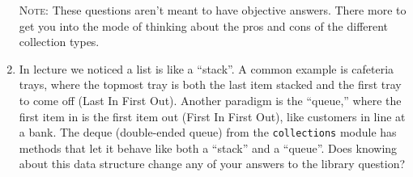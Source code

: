 \documentclass{article}
\begin{document}
\begin{enumerate}
  \textsc{Note}: These questions aren't meant to have objective answers.
  There more to get you into the mode of thinking about the pros and cons
  of the different collection types.

  \item In lecture we noticed a list is like a ``stack''. A common example is
  cafeteria trays, where the topmost tray is both the last item stacked and the
  first tray to come off (Last In First Out). Another paradigm is the
  ``queue,'' where the first item in is the first item out (First In First
  Out), like customers in line at a bank. The deque (double-ended queue) from
  the \texttt{collections} module has methods that let it behave like both a
  ``stack'' and a ``queue''. Does knowing about this data structure change any
  of your answers to the library question?
  \end{enumerate}
 
\end{document}
